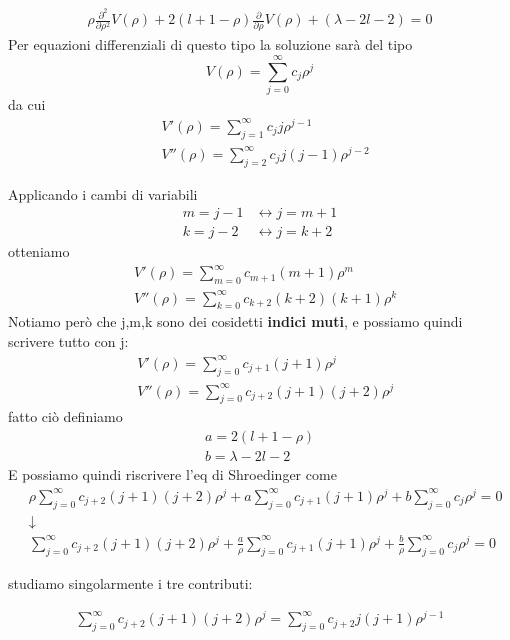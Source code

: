 \begin{align}
\rho  \frac{\partial^2}{\partial \rho^2}V(\rho) + 2(l+1-\rho)\frac{\partial }{\partial \rho}V(\rho) + (\lambda - 2l - 2)=0
\end{align}
Per equazioni differenziali di questo tipo la soluzione sarà del tipo
\begin{equation}
V(\rho)= \sum_{j=0}^\infty c_j \rho^j
\end{equation}
da cui
\begin{align}
{}&V'(\rho)= \sum_{j=1}^\infty c_j  j \rho^{j-1} \\
 &V''(\rho)= \sum_{j=2}^\infty c_j j(j-1) \rho^{j-2}
 \end{align}

\newpage
 
Applicando i cambi di variabili
 \begin{align}
 	m=j-1 {}&\leftrightarrow j=m+1\\
 	k=j-2 &\leftrightarrow j=k+2
 \end{align} 
otteniamo
 \begin{align}
	&V'(\rho)= \sum_{m=0}^\infty c_{m+1} (m+1) \rho^{m} \\
 	&V''(\rho)= \sum_{k=0}^\infty c_{k+2} (k+2)(k+1)\rho^{k}
 \end{align}
Notiamo però che j,m,k sono dei cosidetti \textbf{indici muti}, e possiamo quindi scrivere tutto con j:
 \begin{align}
 	{}&V'(\rho)=  \sum_{j=0}^\infty c_{j+1} (j+1)\rho^j \\
 	&V''(\rho) =  \sum_{j=0}^\infty c_{j+2} (j+1)(j+2)\rho^j
 \end{align}
fatto ciò definiamo
 \begin{align}
 	a= 2(l+1-\rho) \\
 	b= \lambda - 2l - 2
 \end{align}
E possiamo quindi riscrivere l'eq di Shroedinger come
 \begin{align}
 	&\rho \sum_{j=0}^\infty c_{j+2} (j+1)(j+2)\rho^j + a\sum_{j=0}^\infty c_{j+1} (j+1)\rho^j + b\sum_{j=0}^\infty c_j \rho^j=0 \nonumber \\
 	& \downarrow  \nonumber \\
 	&\sum_{j=0}^\infty c_{j+2} (j+1)(j+2)\rho^j + \frac{a}{\rho}\sum_{j=0}^\infty c_{j+1} (j+1)\rho^j + \frac{b}{\rho}\sum_{j=0}^\infty c_j \rho^j=0
 \end{align}
 
 studiamo singolarmente i tre contributi:
 
 \begin{align}
\sum_{j=0}^\infty c_{j+2} (j+1)(j+2)\rho^j = \sum_{j=0}^\infty c_{j+2} j(j+1)\rho^{j-1} 
 \end{align}
 
